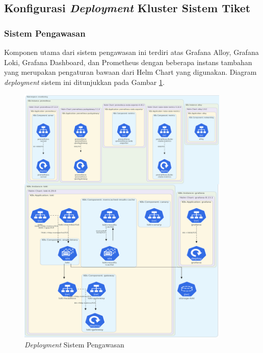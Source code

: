 \subsection{Konfigurasi \textit{Deployment} Kluster Sistem Tiket}

\subsubsection{Sistem Pengawasan}

Komponen utama dari sistem pengawasan ini terdiri atas Grafana Alloy, Grafana Loki, Grafana Dashboard, dan Prometheus dengan beberapa instans tambahan yang merupakan pengaturan bawaan dari Helm Chart yang digunakan. Diagram \textit{deployment} sistem ini ditunjukkan pada Gambar \ref{fig:deployment-monitoring}.

\begin{figure}[htbp!]
    \centering
    \includegraphics[width=0.9\textwidth]{resources/chapter-4/monitoring-1.png}
    \caption{\textit{Deployment} Sistem Pengawasan}
    \label{fig:deployment-monitoring}
\end{figure}

\pagebreak


